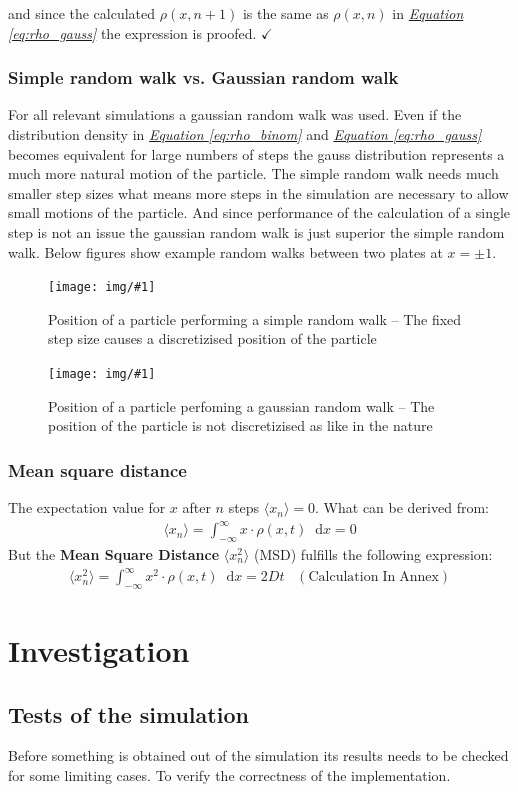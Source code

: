 \documentclass[a4paper, parskip=half]{scrartcl}
\newcommand{\effect}[1]{%
	\textbf{#1}%
}
\newcommand{\myImage}[2]{
	\begin{figure}[H]
	\centering
	\texttt{[image: img/\#1]}
	\caption{#2}
	\label{pic:#1}
	\end{figure}
}
\newcommand{\diff}{\mathop{}\!\mathrm{d}}
\newcommand{\myEqRef}[1]{\textit{\hyperref[eq:#1]{Equation \ref*{eq:#1}}}}
\newcommand{\myEqLabel}[1]{\label{eq:#1}}
\newcommand{\myEqAnnex}[1]{\;\;\;\mathrm{(Calculation\;In\;Annex)} \myEqLabel{#1}}
\begin{document}
and since the calculated $\rho(x,n+1)$ is the same as $\rho(x,n)$ in \myEqRef{rho_gauss} the expression is proofed. $\checkmark$
\subsubsection{Simple random walk vs. Gaussian random walk}

For all relevant simulations a gaussian random walk was used. Even if the distribution density in \myEqRef{rho_binom} and \myEqRef{rho_gauss} becomes equivalent for large numbers of steps the gauss distribution represents a much more natural motion of the particle. The simple random walk needs much smaller step sizes what means more steps in the simulation are necessary to allow small motions of the particle. And since performance of the calculation of a single step is not an issue the gaussian random walk is just superior the simple random walk. Below figures show example random walks between two plates at $x = \pm 1$.

\myImage{fixed_pos}{Position of a particle performing a simple random walk -- The fixed step size causes a discretizised position of the particle}

\myImage{gauss_pos}{Position of a particle perfoming a gaussian random walk -- The position of the particle is not discretizised as like in the nature}
\subsubsection{Mean square distance}
The expectation value for $x$ after $n$ steps $\langle x_n\rangle = 0$. What can be derived from:
\begin{align}
\langle x_n\rangle = \int_{-\infty}^\infty x \cdot \rho(x,t)\diff x = 0
\end{align}
But the \effect{Mean Square Distance} $\langle x_n^2\rangle$ (MSD) fulfills the following expression:
\begin{align}
\langle x_n^2\rangle = \int_{-\infty}^\infty x^2 \cdot \rho(x,t)\diff x = 2 D t \myEqAnnex{MSD}
\end{align}

\newpage
\section{Investigation}
\subsection{Tests of the simulation}
Before something is obtained out of the simulation its results needs to be checked for some limiting cases. To verify the correctness of the implementation.
\end{document}
